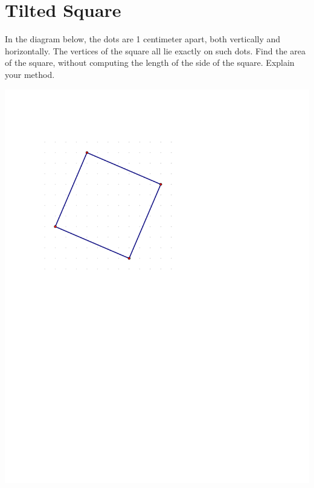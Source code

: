 \newpage

\section{Tilted Square}

\begin{prob}
In the diagram below, the dots are 1 centimeter apart, both vertically and horizontally.  The vertices of the square all lie exactly on such dots. Find the area of the square, without computing the length of the side of the square.  Explain your method.  

\includegraphics{tiltedSquare}

\end{prob}
